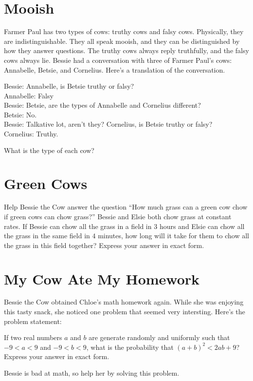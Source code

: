 \documentclass{article}
\begin{document}
\section*{Mooish}
Farmer Paul has two types of cows: truthy cows and falsy cows.
Physically, they are indistinguishable.
They all speak mooish, and they can be distinguished by how they answer questions.
The truthy cows always reply truthfully, and the falsy cows always lie.
Bessie had a conversation with three of Farmer Paul's cows: Annabelle, Betsie, and Cornelius.
Here's a translation of the conversation.
\begin{displayquote}
	Bessie: Annabelle, is Betsie truthy or falsy? \\
	Annabelle: Falsy \\
	Bessie: Betsie, are the types of Annabelle and Cornelius different? \\
	Betsie: No. \\
	Bessie: Talkative lot, aren't they? Cornelius, is Betsie truthy or falsy? \\
	Cornelius: Truthy.
\end{displayquote}
What is the type of each cow?

\section*{Green Cows}
Help Bessie the Cow answer the question ``How much grass can a green cow chow if green cows can chow grass?''
Bessie and Elsie both chow grass at constant rates.
If Bessie can chow all the grass in a field in $3$ hours and Elsie can chow all the grass in the same field in $4$ minutes, how long will it take for them to chow all the grass in this field together?
Express your answer in exact form.

\section*{My Cow Ate My Homework}
Bessie the Cow obtained Chloe's math homework again.
While she was enjoying this tasty snack, she noticed one problem that seemed very intersting.
Here's the problem statement:
\begin{displayquote}
	If two real numbers $a$ and $b$ are generate randomly and uniformly such that $-9 < a < 9$ and $-9 < b < 9$, what is the probability that $(a + b)^2 < 2ab + 9$?
	Express your answer in exact form.
\end{displayquote}
Bessie is bad at math, so help her by solving this problem.
\end{document}
